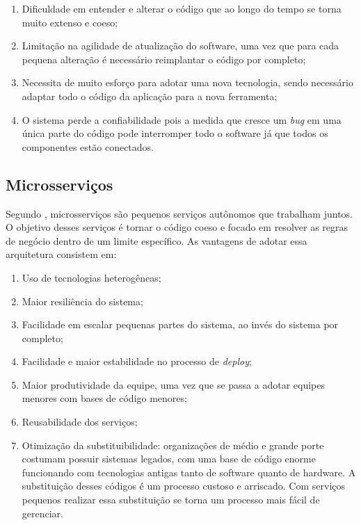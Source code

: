   \begin{enumerate}
    \item Dificuldade em entender e alterar o código que ao longo do tempo se torna
    muito extenso e coeso;
    \item Limitação na agilidade de atualização do software, uma vez que para cada
    pequena alteração é necessário reimplantar o código por completo;
    \item Necessita de muito esforço para adotar uma nova tecnologia, sendo
    necessário adaptar todo o código da aplicação para a nova ferramenta;
    \item O sistema perde a confiabilidade pois a medida que cresce um \textit{bug}
    em uma única parte do código pode interromper todo o software já que todos os
    componentes estão conectados.
  \end{enumerate}

\subsection{Microsserviços}

Segundo , microsserviços são pequenos serviços autônomos que
trabalham juntos. O objetivo desses serviços é tornar o código coeso e focado em
resolver as regras de negócio dentro de um limite específico. As vantagens de adotar
essa arquitetura consistem em:

\begin{enumerate}
    \item{Uso de tecnologias heterogêneas;}
    \item{Maior resiliência do sistema;}
    \item{Facilidade em escalar pequenas partes do sistema, ao invés do sistema por
    completo;}
    \item{Facilidade e maior estabilidade no processo de \textit{deploy};}
    \item{Maior produtividade da equipe, uma vez que se passa a adotar equipes
    menores com bases de código menores;}
    \item{Reusabilidade dos serviços;}
    \item{Otimização da substituibilidade: organizações de médio e grande porte costumam
    possuir sistemas legados, com uma base de código enorme funcionando com tecnologias
    antigas tanto de software quanto de hardware. A substituição desses códigos é um
    processo custoso e arriscado. Com serviços pequenos realizar essa substituição
    se torna um processo mais fácil de gerenciar.}
\end{enumerate}

